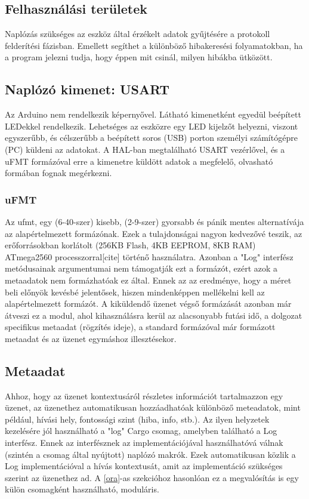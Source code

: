 \label{sec:naplozas}
\subsection{Felhasználási területek}
Naplózás szükséges az eszköz által érzékelt adatok gyűjtésére a protokoll felderítési fázisban.
Emellett segíthet a különböző hibakeresési folyamatokban, ha a program jelezni tudja, hogy éppen mit csinál, milyen hibákba ütközött.

\subsection{Naplózó kimenet: USART}
Az Arduino nem rendelkezik képernyővel. Látható kimenetként egyedül beépített LEDekkel rendelkezik.
Lehetséges az eszközre egy LED kijelzőt helyezni, viszont egyszerűbb, és célszerűbb a beépített soros (USB) porton személyi számítógépre (PC) küldeni az adatokat.
A HAL-ban megtalálható USART vezérlővel, és a uFMT formázóval erre a kimenetre küldött adatok a megfelelő, olvasható formában fognak megérkezni.

\subsubsection{uFMT}
Az ufmt, egy (6-40-szer) kisebb, (2-9-szer) gyorsabb és pánik mentes alternatívája az alapértelmezett formázónak.\cite{ufmt_rust}
Ezek a tulajdonságai nagyon kedvezővé teszik, az erőforrásokban korlátolt (256KB Flash, 4KB EEPROM, 8KB RAM) ATmega2560 processzorral[cite] történő használatra.
Azonban a "Log" interfész metódusainak argumentumai nem támogatják ezt a formázót, ezért azok a metaadatok nem formázhatóak ez által.
Ennek az az eredménye, hogy a méret beli előnyök kevésbé jelentősek, hiszen mindenképpen mellékelni kell az alapértelmezett formázót.
A kiküldendő üzenet végső formázását azonban már átveszi ez a modul, ahol kihasználásra kerül az alacsonyabb futási idő, a dolgozat specifikus metaadat (rögzítés ideje), a standard formázóval már formázott metaadat és az üzenet egymáshoz illesztésekor.

\subsection{Metaadat}
Ahhoz, hogy az üzenet kontextusáról részletes információt tartalmazzon egy üzenet, az üzenethez automatikusan hozzáadhatóak különböző meteadatok, mint például, hívási hely, fontossági szint (hiba, info, stb.).
Az ilyen helyzetek kezelésére jól használható a "log" Cargo csomag, amelyben található a Log interfész. 
Ennek az interfésznek az implementációjával használhatóvá válnak (szintén a csomag által nyújtott) naplózó makrók.
Ezek automatikusan közlik a Log implementációval a hívás kontextusát, amit az implementáció szükséges szerint az üzenethez ad.
A \ref{ora}-as szekcióhoz hasonlóan ez a megvalósítás is egy külön csomagként használható, moduláris.

